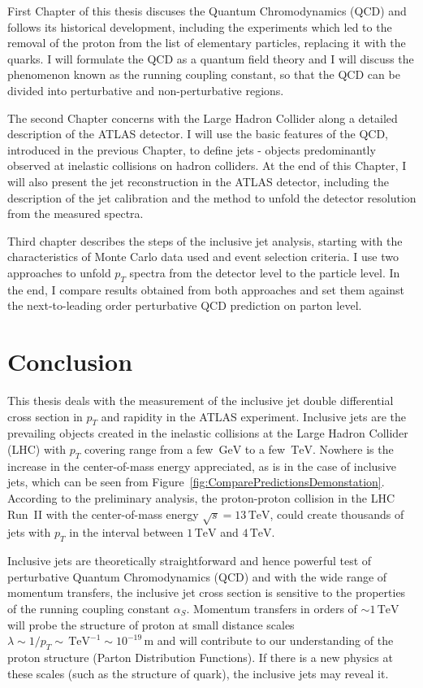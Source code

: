 \documentclass[a4paper,11pt,twoside,openright]{book}
\newcommand{\TeV}{\,\text{TeV}}
\newcommand{\GeV}{\,\text{GeV}}
\newcommand{\pt}{p_{T}}
\begin{document}
First Chapter of this thesis discuses the Quantum Chromodynamics (QCD) and
follows its historical development, including the experiments which led to the
removal of the proton from the list of elementary particles, replacing it with
the quarks. 
I will formulate the QCD as a quantum field theory and I will discuss the phenomenon
known as the running coupling constant, so that the QCD can be divided into
perturbative and non-perturbative regions.

The second Chapter concerns with the Large Hadron Collider along a detailed
description of the ATLAS detector. 
I will use the basic features of the QCD, introduced in the previous Chapter, to
define jets - objects predominantly observed at inelastic collisions on hadron
colliders. At the end of this Chapter, I will also present the jet
reconstruction in the ATLAS detector, including the description of the jet calibration and
the method to unfold the detector resolution from the measured spectra.

Third chapter describes the steps of the inclusive jet analysis, starting with
the characteristics of Monte Carlo data used and event selection 
criteria. I use two approaches to unfold $\pt$ spectra from the
detector level to the particle level. In the end, I compare results obtained from
both approaches and set them against the next-to-leading order perturbative QCD
prediction on parton level.





\chapter*{Conclusion}

This thesis deals with the measurement of the inclusive jet double differential
cross section in $\pt$ and rapidity in the ATLAS experiment. Inclusive jets are
the prevailing objects created in the inelastic collisions at the Large Hadron
Collider (LHC) with $\pt$
covering range from a few $\GeV$ to a few $\TeV$. Nowhere is the increase in the
center-of-mass energy appreciated, as is in the case of inclusive jets, which can
be seen from Figure~\ref{fig:ComparePredictionsDemonstation}. According to the
preliminary analysis, the proton-proton collision in the LHC Run~II with the center-of-mass
energy $\sqrt{s} = 13\TeV$, could create thousands of jets with $\pt$ in the
interval between $1\TeV$ and $4\TeV$.

Inclusive jets are theoretically straightforward and hence powerful test of
perturbative Quantum Chromodynamics (QCD) and with the wide range of 
momentum transfers, the inclusive jet cross section is sensitive to the
properties of the running coupling constant $\alpha_S$.  Momentum transfers in
orders of $\sim 1 \TeV$ will probe the structure of proton at small distance
scales $\lambda \sim 1 / \pt \sim \TeV^{-1} \sim 10^{-19} \, \text{m}$ and will
contribute to our understanding of the proton structure (Parton Distribution
Functions). If there is a new physics at these scales (such as the
structure of quark), the inclusive jets may reveal it.
\end{document}
